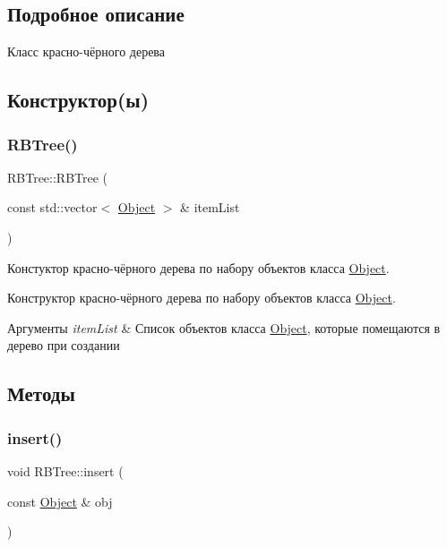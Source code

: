 \subsection{Подробное описание}
Класс красно-\/чёрного дерева 

\subsection{Конструктор(ы)}
\mbox{\label{classRBTree_afdab010948bf322d42bd33127b5a1b58}} 
\subsubsection{\texorpdfstring{R\+B\+Tree()}{RBTree()}}
{\footnotesize\ttfamily R\+B\+Tree\+::\+R\+B\+Tree (\begin{DoxyParamCaption}\item[{const std\+::vector$<$ \mbox{\hyperlink{structObject}{Object}} $>$ \&}]{item\+List }\end{DoxyParamCaption})}



Констуктор красно-\/чёрного дерева по набору объектов класса \mbox{\hyperlink{structObject}{Object}}. 

Конструктор красно-\/чёрного дерева по набору объектов класса \mbox{\hyperlink{structObject}{Object}}.


\begin{DoxyParams}{Аргументы}
{\em item\+List} & Список объектов класса \mbox{\hyperlink{structObject}{Object}}, которые помещаются в дерево при создании \\
\hline
\end{DoxyParams}


\subsection{Методы}
\mbox{\label{classRBTree_acb80f239f846884ed1a7ca2c0d2515bb}} 
\subsubsection{\texorpdfstring{insert()}{insert()}}
{\footnotesize\ttfamily void R\+B\+Tree\+::insert (\begin{DoxyParamCaption}\item[{const \mbox{\hyperlink{structObject}{Object}} \&}]{obj }\end{DoxyParamCaption})}



